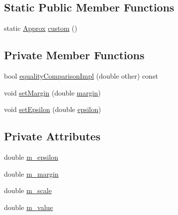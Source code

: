 \subsection*{Static Public Member Functions}
\begin{DoxyCompactItemize}
\item 
static \mbox{\hyperlink{class_catch_1_1_detail_1_1_approx}{Approx}} \mbox{\hyperlink{class_catch_1_1_detail_1_1_approx_aaf86dc0ee92272ac2d9839197a07951d}{custom}} ()
\end{DoxyCompactItemize}
\subsection*{Private Member Functions}
\begin{DoxyCompactItemize}
\item 
bool \mbox{\hyperlink{class_catch_1_1_detail_1_1_approx_af53c48227a7b654da58adeb1d360b715}{equality\+Comparison\+Impl}} (double other) const
\item 
void \mbox{\hyperlink{class_catch_1_1_detail_1_1_approx_aff04b8b32edc707138eb395ed45ec576}{set\+Margin}} (double \mbox{\hyperlink{class_catch_1_1_detail_1_1_approx_a6467dc18791e1a1f4c15c4fb63cf5051}{margin}})
\item 
void \mbox{\hyperlink{class_catch_1_1_detail_1_1_approx_a28fd65e069b698bc7ae8f060bfbcd6b6}{set\+Epsilon}} (double \mbox{\hyperlink{class_catch_1_1_detail_1_1_approx_acd26adba86a066b9f40dad467f23bc85}{epsilon}})
\end{DoxyCompactItemize}
\subsection*{Private Attributes}
\begin{DoxyCompactItemize}
\item 
double \mbox{\hyperlink{class_catch_1_1_detail_1_1_approx_af17c8e869ae7a55d14b99eb18e178114}{m\+\_\+epsilon}}
\item 
double \mbox{\hyperlink{class_catch_1_1_detail_1_1_approx_a4262a7e821eec507b424c335121ea0d8}{m\+\_\+margin}}
\item 
double \mbox{\hyperlink{class_catch_1_1_detail_1_1_approx_a65e9bdab9113ff3300b45f0a4e048dd7}{m\+\_\+scale}}
\item 
double \mbox{\hyperlink{class_catch_1_1_detail_1_1_approx_af7aeef703bd591f5ec85407b1dac053c}{m\+\_\+value}}
\end{DoxyCompactItemize}
